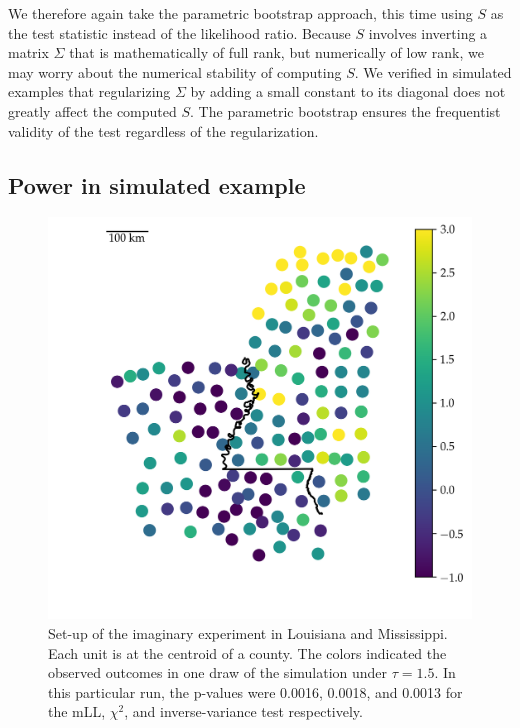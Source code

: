 \documentclass[letter]{article}
\makeatletter
\def\maxwidth{\ifdim\Gin@nat@width>\linewidth\linewidth
\else\Gin@nat@width\fi}
\let\Oldincludegraphics\includegraphics
\renewcommand{\includegraphics}[1]{\Oldincludegraphics[width=1.0\maxwidth]{#1}}
\makeatother
\begin{document}
We therefore again take the parametric bootstrap approach, this time using \(S\) as the test statistic instead of the likelihood ratio.
Because \(S\) involves inverting a matrix \(\Sigma\) that is mathematically of full rank, but numerically of low rank, we may worry about the numerical stability of computing \(S\).
We verified in simulated examples that regularizing \(\Sigma\) by adding a small constant to its diagonal does not greatly affect the computed \(S\).
The parametric bootstrap ensures the frequentist validity of the test
regardless of the regularization.
    


    	\subsection{Power in simulated example}\label{power-in-simulated-example}
    


    	\begin{figure}
\centering
\includegraphics{../figures/mississippi_sim.png}
\caption{\label{fig:mississippi_counties}Set-up of the imaginary experiment in Louisiana and Mississippi. Each unit is at the centroid of a county. The colors indicated the observed outcomes in one draw of the simulation under \(\tau=1.5\). In this particular run, the p-values were 0.0016, 0.0018, and 0.0013 for the mLL, \(\chi^2\), and inverse-variance test respectively.}
\end{figure}
\end{document}
